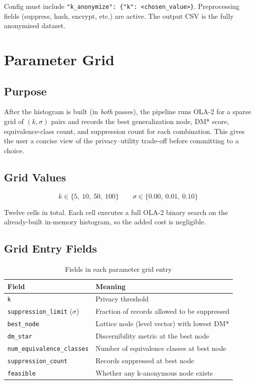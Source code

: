 \documentclass[12pt,a4paper]{article}
\begin{document}
Config must include \texttt{"k\_anonymize": \{"k": <chosen\_value>\}}.
Preprocessing fields (suppress, hash, encrypt, etc.) are active.
The output CSV is the fully anonymised dataset.

\section{Parameter Grid}

\subsection{Purpose}

After the histogram is built (in \emph{both} passes), the pipeline runs
OLA-2 for a sparse grid of $(k, \sigma)$ pairs and records the best
generalization node, DM* score, equivalence-class count, and suppression count
for each combination. This gives the user a concise view of the
privacy--utility trade-off before committing to a choice.

\subsection{Grid Values}

\[
  k \in \{5,\ 10,\ 50,\ 100\}
  \qquad
  \sigma \in \{0.00,\ 0.01,\ 0.10\}
\]

Twelve cells in total. Each cell executes a full OLA-2 binary search on the
already-built in-memory histogram, so the added cost is negligible.

\subsection{Grid Entry Fields}

\begin{table}[H]
\centering
\caption{Fields in each parameter grid entry}
\begin{tabular}{ll}
\toprule
Field & Meaning \\
\midrule
\texttt{k} & Privacy threshold \\
\texttt{suppression\_limit} ($\sigma$) & Fraction of records allowed to be suppressed \\
\texttt{best\_node} & Lattice node (level vector) with lowest DM* \\
\texttt{dm\_star} & Discernibility metric at the best node \\
\texttt{num\_equivalence\_classes} & Number of equivalence classes at best node \\
\texttt{suppression\_count} & Records suppressed at best node \\
\texttt{feasible} & Whether any k-anonymous node exists \\
\bottomrule
\end{tabular}
\end{table}
\end{document}
